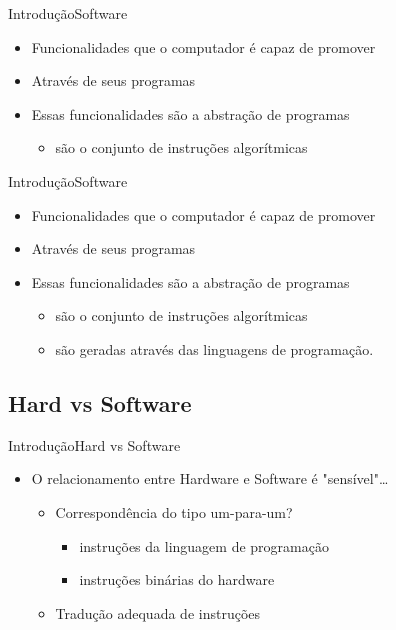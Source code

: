 \documentclass{beamer}
\begin{document}
\begin{frame}{Introdução}{Software}
  \begin{itemize}
    \item Funcionalidades que o computador é capaz de promover
    \item Através de seus programas
    \item Essas funcionalidades são a abstração de programas
      \begin{itemize}
        \item são o conjunto de instruções algorítmicas
      \end{itemize}
    \end{itemize}
\end{frame}

\begin{frame}{Introdução}{Software}
  \begin{itemize}
    \item Funcionalidades que o computador é capaz de promover
    \item Através de seus programas
    \item Essas funcionalidades são a abstração de programas
      \begin{itemize}
        \item são o conjunto de instruções algorítmicas 
        \item são geradas através das linguagens de programação.
      \end{itemize}
    \end{itemize}
\end{frame}

\subsection{Hard vs Software}

\begin{frame}{Introdução}{Hard vs Software}
  \begin{itemize}
    \item O relacionamento entre Hardware e Software é "sensível"\dots
      \begin{itemize}
        \item Correspondência do tipo um-para-um?
          \begin{itemize}
            \item instruções da linguagem de programação 
            \item instruções binárias do hardware
          \end{itemize}
        \item Tradução adequada de instruções
      \end{itemize}
  \end{itemize}
\end{frame}
\end{document}
